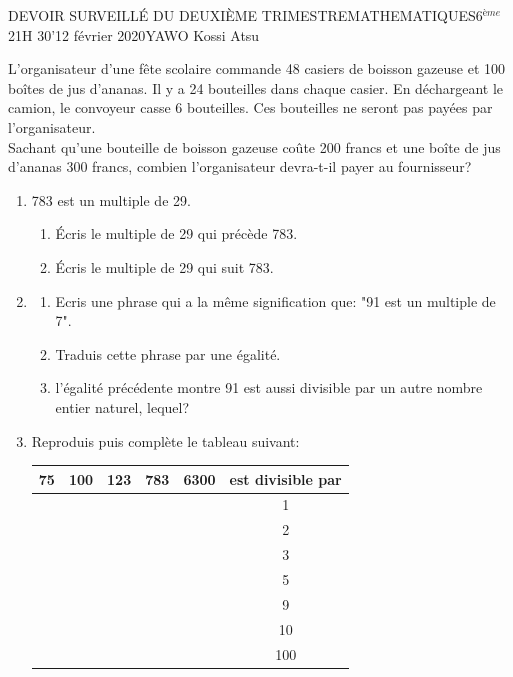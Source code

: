 \documentclass[12pt,a4paper]{book}
\newcommand{\prof}{YAWO Kossi Atsu}
\newcommand{\matiere}{MATHEMATIQUES}
\newcommand{\classe}{6$^{ème}$}
\begin{document}
\newpage
\begin{devoir}{DEVOIR SURVEILLÉ DU DEUXIÈME TRIMESTRE}{\matiere}{\classe}{2}{1H 30'}{12 février 2020}{\prof}
\begin{exo}[8pts]
L'organisateur d'une fête scolaire commande 48 casiers de boisson gazeuse et 100 boîtes de jus d'ananas. Il y a 24 bouteilles dans chaque casier. En déchargeant le camion, le convoyeur casse 6 bouteilles. Ces bouteilles ne seront pas payées par l'organisateur. \\ Sachant qu'une bouteille de boisson gazeuse coûte 200 francs et une boîte de jus d'ananas 300 francs, combien l'organisateur devra-t-il payer au fournisseur?
\end{exo}

\vspace{1cm}

\begin{exo}[6]
\begin{enumerate}
\item 783 est un multiple de 29.
\begin{enumerate}
\item Écris le multiple de 29 qui précède 783.
\item Écris le multiple de 29 qui suit 783.
\end{enumerate}
\item \begin{enumerate}
\item Ecris une phrase qui a la même signification que: "91 est un multiple de 7".
\item Traduis cette phrase par une égalité.
\item l'égalité précédente montre 91 est aussi divisible par un autre nombre entier naturel, lequel?
\end{enumerate}
\item Reproduis puis complète le tableau suivant:\\
\begin{tabular}{|c|c|c|c|c|c|}
\hline 
75 & 100 & 123 & 783 & 6300 & est divisible par \\ 
\hline 
 &  &  &  &  & 1 \\ 
\hline 
 & &  &  &  & 2 \\ 
\hline 
 &  & &  &  & 3 \\ 
\hline 
 &  &  &  &  & 5 \\ 
\hline 
 &  &  &  &  & 9 \\ 
\hline 
 & & &  &  & 10 \\ 
\hline 
 &  &  &  &  & 100 \\ 
\hline 
\end{tabular} 
\end{enumerate}
\end{exo}


\end{devoir}
\end{document}
